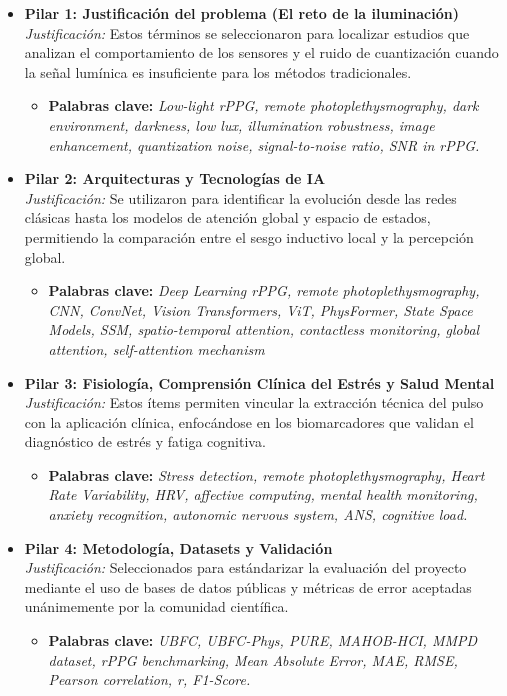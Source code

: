 \begin{itemize}
    \item \textbf{Pilar 1: Justificación del problema (El reto de la iluminación)} \\
    \textit{Justificación:} Estos términos se seleccionaron para localizar estudios que analizan el comportamiento de los sensores y el ruido de cuantización 
    cuando la señal lumínica es insuficiente para los métodos tradicionales.
    \begin{itemize}
        \item \textbf{Palabras clave:} \textit{Low-light rPPG, remote photoplethysmography, dark environment, darkness, low lux, illumination robustness, 
        image enhancement, quantization noise, signal-to-noise ratio, SNR in rPPG.}
    \end{itemize}

    \item \textbf{Pilar 2: Arquitecturas y Tecnologías de IA} \\
    \textit{Justificación:} Se utilizaron para identificar la evolución desde las redes clásicas hasta los modelos de atención global y espacio de estados, 
    permitiendo la comparación entre el sesgo inductivo local y la percepción global.
    \begin{itemize}
        \item \textbf{Palabras clave:} \textit{Deep Learning rPPG, remote photoplethysmography, CNN, ConvNet, Vision Transformers, ViT, PhysFormer, State Space Models, SSM, 
        spatio-temporal attention, contactless monitoring, global attention, self-attention mechanism}
    \end{itemize}

    \item \textbf{Pilar 3: Fisiología, Comprensión Clínica del Estrés y Salud Mental} \\
    \textit{Justificación:} Estos ítems permiten vincular la extracción técnica del pulso con la aplicación clínica, enfocándose en los biomarcadores que validan 
    el diagnóstico de estrés y fatiga cognitiva.
    \begin{itemize}
        \item \textbf{Palabras clave:} \textit{Stress detection, remote photoplethysmography, Heart Rate Variability, HRV, affective computing, mental health monitoring, anxiety recognition, 
        autonomic nervous system, ANS, cognitive load.}
    \end{itemize}

    \item \textbf{Pilar 4: Metodología, Datasets y Validación} \\
    \textit{Justificación:} Seleccionados para estándarizar la evaluación del proyecto mediante el uso de bases de datos públicas y métricas de error aceptadas 
    unánimemente por la comunidad científica.
    \begin{itemize}
        \item \textbf{Palabras clave:} \textit{UBFC, UBFC-Phys, PURE, MAHOB-HCI, MMPD dataset, rPPG benchmarking, Mean Absolute Error, MAE, RMSE, Pearson correlation, r, F1-Score.}
    \end{itemize}
\end{itemize}

